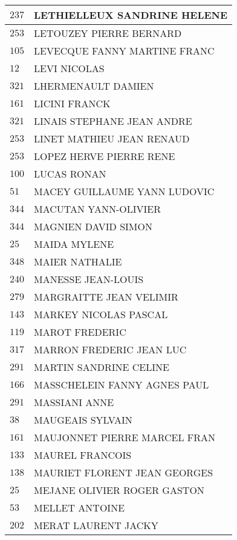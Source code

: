\begin{xltabular}{\linewidth}{|l|X|}
    \hline
    $237$ & LETHIELLEUX SANDRINE HELENE \\
    \hline
    $253$ & LETOUZEY PIERRE BERNARD \\
    \hline
    $105$ & LEVECQUE FANNY MARTINE FRANC \\
    \hline
    $12$ & LEVI NICOLAS \\
    \hline
    $321$ & LHERMENAULT DAMIEN \\
    \hline
    $161$ & LICINI FRANCK \\
    \hline
    $321$ & LINAIS STEPHANE JEAN ANDRE \\
    \hline
    $253$ & LINET MATHIEU JEAN RENAUD \\
    \hline
    $253$ & LOPEZ HERVE PIERRE RENE \\
    \hline
    $100$ & LUCAS RONAN \\
    \hline
    $51$ & MACEY GUILLAUME YANN LUDOVIC \\
    \hline
    $344$ & MACUTAN YANN-OLIVIER \\
    \hline
    $344$ & MAGNIEN DAVID SIMON \\
    \hline
    $25$ & MAIDA MYLENE \\
    \hline
    $348$ & MAIER NATHALIE \\
    \hline
    $240$ & MANESSE JEAN-LOUIS \\
    \hline
    $279$ & MARGRAITTE JEAN VELIMIR \\
    \hline
    $143$ & MARKEY NICOLAS PASCAL \\
    \hline
    $119$ & MAROT FREDERIC \\
    \hline
    $317$ & MARRON FREDERIC JEAN LUC \\
    \hline
    $291$ & MARTIN SANDRINE CELINE \\
    \hline
    $166$ & MASSCHELEIN FANNY AGNES PAUL \\
    \hline
    $291$ & MASSIANI ANNE \\
    \hline
    $38$ & MAUGEAIS SYLVAIN \\
    \hline
    $161$ & MAUJONNET PIERRE MARCEL FRAN \\
    \hline
    $133$ & MAUREL FRANCOIS \\
    \hline
    $138$ & MAURIET FLORENT JEAN GEORGES \\
    \hline
    $25$ & MEJANE OLIVIER ROGER GASTON \\
    \hline
    $53$ & MELLET ANTOINE \\
    \hline
    $202$ & MERAT LAURENT JACKY \\

\end{xltabular}
